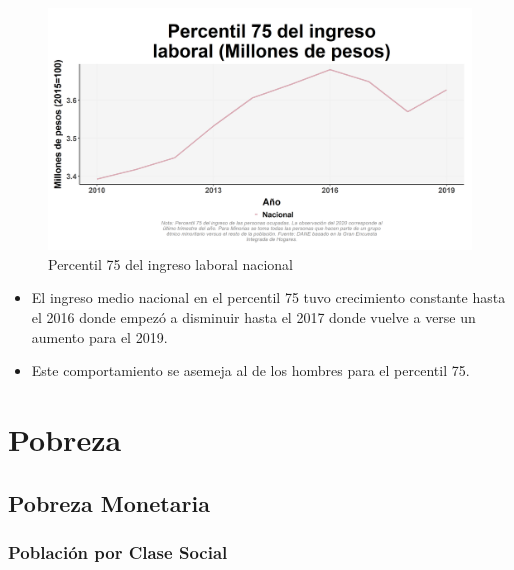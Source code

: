     \begin{figure}[H]
        \caption{Percentil 75 del ingreso laboral nacional \label{map_result_2} }
        \begin{center}
        \includegraphics[width=\textwidth,keepaspectratio]{img/var_27_trend.png}
        \end{center}
    \end{figure}
            \begin{itemize}
                    \item El ingreso medio nacional en el percentil 75 tuvo crecimiento constante hasta el 2016 donde empezó a disminuir hasta el 2017 donde vuelve a verse un aumento para el 2019.
                    \item Este comportamiento se asemeja al de los hombres para el percentil 75.
                \end{itemize}

\section{Pobreza}
    \subsection{Pobreza Monetaria}
        \subsubsection{Población por Clase Social}

